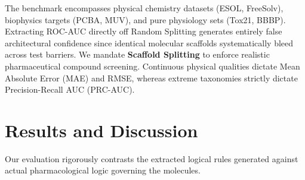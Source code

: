 \documentclass[preprint,12pt,authoryear]{elsarticle}
\begin{document}
The benchmark encompasses physical chemistry datasets (ESOL, FreeSolv), biophysics targets (PCBA, MUV), and pure physiology sets (Tox21, BBBP). Extracting ROC-AUC directly off Random Splitting generates entirely false architectural confidence since identical molecular scaffolds systematically bleed across test barriers. We mandate \textbf{Scaffold Splitting} to enforce realistic pharmaceutical compound screening. Continuous physical qualities dictate Mean Absolute Error (MAE) and RMSE, whereas extreme taxonomies strictly dictate Precision-Recall AUC (PRC-AUC).

\begin{table}[hbt!]
\caption{Characteristics of Evaluated Datasets (Classification and Regression)}
\label{tab:dataset_stats}
\centering
{}
\end{table}

\section{Results and Discussion}
\label{sec:results}

Our evaluation rigorously contrasts the extracted logical rules generated against actual pharmacological logic governing the molecules.
\end{document}
